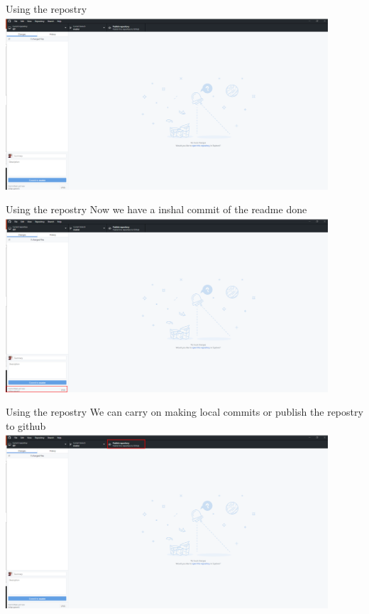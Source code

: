 \documentclass[10pt]{beamer}
\begin{document}
\begin{frame}[fragile]{Using the repostry}
	\includegraphics[width=12cm]{Figs/GHD/outline_02}
\end{frame}


\begin{frame}[fragile]{Using the repostry}
	\small Now we have a inshal commit of the readme done
	\includegraphics[width=12cm]{Figs/GHD/outline_09}
\end{frame}


\begin{frame}[fragile]{Using the repostry}
	\small We can carry on making local commits or publish the repostry to github
	\includegraphics[width=12cm]{Figs/GHD/outline_03}
\end{frame}
\end{document}

